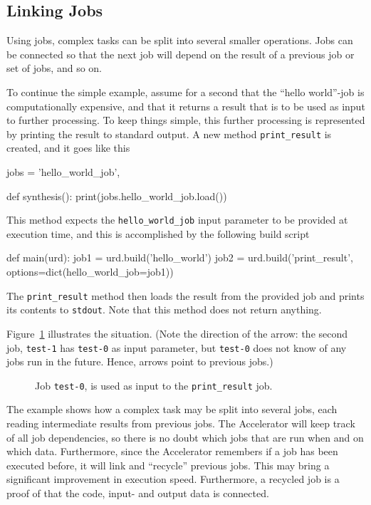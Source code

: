 \subsection{Linking Jobs}

Using jobs, complex tasks can be split into several smaller
operations.  Jobs can be connected so that the next job will depend on
the result of a previous job or set of jobs, and so on.

To continue the simple example, assume for a second that the ``hello
world''-job is computationally expensive, and that it returns a result
that is to be used as input to further processing.  To keep things
simple, this further processing is represented by printing the result
to standard output.  A new method \texttt{print\_result} is created,
and it goes like this
\begin{python}
jobs = {'hello_world_job',}

def synthesis():
    print(jobs.hello_world_job.load())
\end{python}
This method expects the \texttt{hello\_world\_job} input parameter to
be provided at execution time, and this is accomplished by the
following build script
\begin{python}
def main(urd):
    job1 = urd.build('hello_world')
    job2 = urd.build('print_result', options=dict(hello_world_job=job1))
\end{python}
The \texttt{print\_result} method then loads the result from the
provided job and prints its contents to \texttt{stdout}.  Note that
this method does not return anything.

Figure~\ref{fig:execflow-print-result} illustrates the situation.
(Note the direction of the arrow: the second job, \texttt{test-1} has
\texttt{test-0} as input parameter, but \texttt{test-0} does not know
of any jobs run in the future.  Hence, arrows point to previous jobs.)

\begin{figure}[h!]
  \begin{center}
    
    \caption{Job \texttt{test-0}, is used as input to the
      \texttt{print\_result} job.}
    \label{fig:execflow-print-result}
  \end{center}
\end{figure}

The example shows how a complex task may be split into several jobs,
each reading intermediate results from previous jobs.  The Accelerator
will keep track of all job dependencies, so there is no doubt which
jobs that are run when and on which data.  Furthermore, since the
Accelerator remembers if a job has been executed before, it will link
and ``recycle'' previous jobs.  This may bring a significant
improvement in execution speed.  Furthermore, a recycled job is a
proof of that the code, input- and output data is connected.


